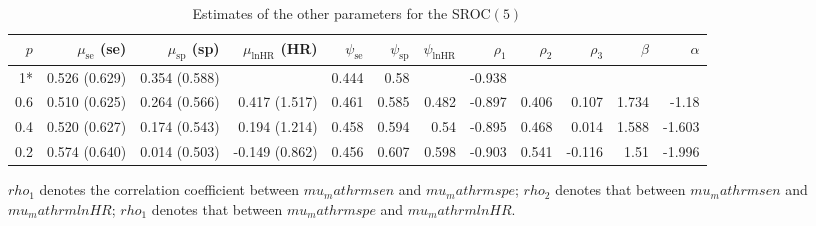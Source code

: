 \begin{table}[!htb]

\caption{\label{tab:sroc-ki67-5}Estimates of the other parameters for the SROC$(5)$}
\centering
\begin{threeparttable}
\begin{tabular}[t]{rrrrrrrrrrrr}
\toprule
$p$ & $\mu_\mathrm{se}$ (se) & $\mu_\mathrm{sp}$ (sp) & $\mu_\mathrm{lnHR}$ (HR) & $\psi_\mathrm{se}$ & $\psi_\mathrm{sp}$ & $\psi_\mathrm{lnHR}$ & $\rho_1$ & $\rho_2$ & $\rho_3$ & $\beta$ & $\alpha$\\
\midrule
1* & 0.526 (0.629) & 0.354 (0.588) &  & 0.444 & 0.58 &  & -0.938 &  &  &  & \\
0.6 & 0.510 (0.625) & 0.264 (0.566) & 0.417 (1.517) & 0.461 & 0.585 & 0.482 & -0.897 & 0.406 & 0.107 & 1.734 & -1.18\\
0.4 & 0.520 (0.627) & 0.174 (0.543) & 0.194 (1.214) & 0.458 & 0.594 & 0.54 & -0.895 & 0.468 & 0.014 & 1.588 & -1.603\\
0.2 & 0.574 (0.640) & 0.014 (0.503) & -0.149 (0.862) & 0.456 & 0.607 & 0.598 & -0.903 & 0.541 & -0.116 & 1.51 & -1.996\\
\bottomrule
\end{tabular}
\begin{tablenotes}
\item 
			$rho_1$ denotes the correlation coefficient between $mu_mathrm{sen}$ and $mu_mathrm{spe}$;
			$rho_2$ denotes that between $mu_mathrm{sen}$ and $mu_mathrm{lnHR}$;
			$rho_1$ denotes that between $mu_mathrm{spe}$ and $mu_mathrm{lnHR}$.
\end{tablenotes}
\end{threeparttable}
\end{table}
